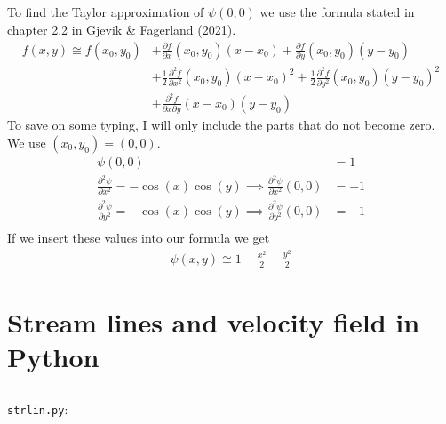 \documentclass[a4paper,10pt,english]{article}
\begin{document}
\subsection{} \label{3e}
To find the Taylor approximation of $\psi(0, 0)$ we use the formula stated in chapter 2.2 in Gjevik \& Fagerland (2021).
\begin{align*}
    f(x, y) \cong f(x_0, y_0) 
    &+ \frac{\partial f}{\partial x}(x_0, y_0)(x-x_0)
    + \frac{\partial f}{\partial y}(x_0, y_0)(y-y_0) \\
    &+ \frac{1}{2}\frac{\partial^2 f}{\partial x^2}(x_0, y_0) (x-x_0)^2
    + \frac{1}{2}\frac{\partial^2 f}{\partial y^2}(x_0, y_0) (y-y_0)^2 \\
    &+ \frac{\partial^2 f}{\partial x \partial y} (x-x_0)(y-y_0)
\end{align*}
To save on some typing, I will only include the parts that do not become zero. We use $(x_0, y_0) = (0, 0)$.
\begin{align*}
    \psi(0, 0) &= 1 \\
    \frac{\partial^2 \psi}{\partial x^2} = -\cos(x)\cos(y) 
        \implies \frac{\partial^2 \psi}{\partial x^2} (0, 0) &= -1 \\
    \frac{\partial^2 \psi}{\partial y^2} = -\cos(x)\cos(y) 
        \implies \frac{\partial^2 \psi}{\partial y^2} (0, 0) &= -1 \\
\end{align*}
If we insert these values into our formula we get
\begin{align}
    \psi (x, y) \cong 1 - \frac{x^2}{2} - \frac{y^2}{2}
    \label{eq:9}
\end{align}

\section{Stream lines and velocity field in Python}
\subsection{}
\verb|strlin.py|:

\end{document}
